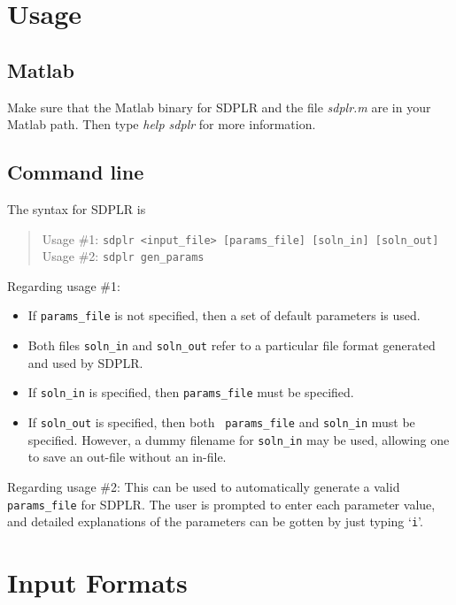 \documentclass[12pt]{article}
\begin{document}
\section{Usage}


\subsection{Matlab}

Make sure that the Matlab binary for SDPLR and the file {\sl sdplr.m\/}
are in your Matlab path. Then type {\sl help sdplr} for more
information.

\subsection{Command line}

The syntax for SDPLR is
\begin{quote}
Usage \#1: {\tt sdplr <input\_file> [params\_file] [soln\_in]
[soln\_out]} \\ Usage \#2: {\tt sdplr gen\_params}
\end{quote}

\noindent Regarding usage \#1:

\begin{itemize}

\item If {\tt params\_file} is not specified, then a set of
default parameters is used.

\item Both files {\tt soln\_in} and {\tt soln\_out} refer to a
particular file format generated and used by SDPLR.

\item If {\tt soln\_in} is specified, then {\tt params\_file} must
be specified.

\item If {\tt soln\_out} is specified, then both {\tt
params\_file} and {\tt soln\_in} must be specified. However, a
dummy filename for {\tt soln\_in} may be used, allowing one to
save an out-file without an in-file.


\end{itemize}

\noindent Regarding usage \#2: This can be used to automatically
generate a valid {\tt params\_file} for SDPLR. The user is
prompted to enter each parameter value, and detailed explanations
of the parameters can be gotten by just typing `{\tt i}'.

\section{Input Formats}
\end{document}
